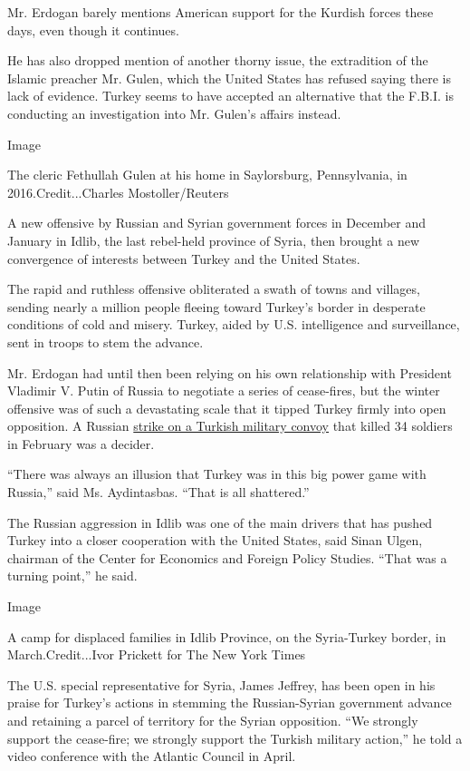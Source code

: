Mr. Erdogan barely mentions American support for the Kurdish forces
these days, even though it continues.

He has also dropped mention of another thorny issue, the extradition of
the Islamic preacher Mr. Gulen, which the United States has refused
saying there is lack of evidence. Turkey seems to have accepted an
alternative that the F.B.I. is conducting an investigation into Mr.
Gulen's affairs instead.

Image

The cleric Fethullah Gulen at his home in Saylorsburg, Pennsylvania, in
2016.Credit...Charles Mostoller/Reuters

A new offensive by Russian and Syrian government forces in December and
January in Idlib, the last rebel-held province of Syria, then brought a
new convergence of interests between Turkey and the United States.

The rapid and ruthless offensive obliterated a swath of towns and
villages, sending nearly a million people fleeing toward Turkey's border
in desperate conditions of cold and misery. Turkey, aided by U.S.
intelligence and surveillance, sent in troops to stem the advance.

Mr. Erdogan had until then been relying on his own relationship with
President Vladimir V. Putin of Russia to negotiate a series of
cease-fires, but the winter offensive was of such a devastating scale
that it tipped Turkey firmly into open opposition. A Russian
\href{https://www.nytimes.com/2020/02/27/world/middleeast/russia-turkey-syria-war-strikes.html}{strike
on a Turkish military convoy} that killed 34 soldiers in February was a
decider.

``There was always an illusion that Turkey was in this big power game
with Russia,'' said Ms. Aydintasbas. ``That is all shattered.''

The Russian aggression in Idlib was one of the main drivers that has
pushed Turkey into a closer cooperation with the United States, said
Sinan Ulgen, chairman of the Center for Economics and Foreign Policy
Studies. ``That was a turning point,'' he said.

Image

A camp for displaced families in Idlib Province, on the Syria-Turkey
border, in March.Credit...Ivor Prickett for The New York Times

The U.S. special representative for Syria, James Jeffrey, has been open
in his praise for Turkey's actions in stemming the Russian-Syrian
government advance and retaining a parcel of territory for the Syrian
opposition. ``We strongly support the cease-fire; we strongly support
the Turkish military action,'' he told a video conference with the
Atlantic Council in April.

